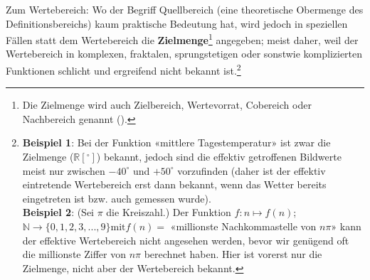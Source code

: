 
\begin{bemerkung}{}{}
  Zum Wertebereich: Wo der Begriff Quellbereich (eine theoretische Obermenge
  des Definitionsbereichs) kaum praktische Bedeutung hat,
  wird jedoch in speziellen Fällen statt dem Wertebereich die
  \textbf{Zielmenge}\footnote{Die Zielmenge
    wird auch Zielbereich, Wertevorrat,
    Cobereich oder Nachbereich
    genannt (\cite{FormelnUndTafeln19}).}
  angegeben; meist daher, weil der
  Wertebereich in komplexen, fraktalen, sprungstetigen oder sonstwie komplizierten Funktionen schlicht
  und ergreifend nicht bekannt ist.\footnote{\textbf{Beispiel 1}: Bei der Funktion
    «mittlere Tagestemperatur» ist zwar die Zielmenge ($\mathbb{R}[{}^\circ]$)
    bekannt, jedoch sind die effektiv getroffenen Bildwerte meist nur
    zwischen $-40^\circ$ und $+50^\circ$ vorzufinden (daher ist der
    effektiv eintretende Wertebereich erst dann bekannt, wenn das Wetter
    bereits eingetreten ist bzw. auch gemessen wurde). \\
    \textbf{Beispiel 2}: (Sei $\pi$ die Kreiszahl.) Der Funktion $f: n\mapsto f(n)$; $\mathbb{N} \rightarrow \{0, 1, 2, 3, ..., 9\} \text{mit} f(n) = $
    «millionste Nachkommastelle von $n\pi$»
    kann der effektive Wertebereich nicht
  angesehen werden, bevor wir genügend oft die millionste Ziffer von
  $n\pi$ berechnet haben. Hier ist vorerst nur die Zielmenge, nicht
  aber der Wertebereich bekannt.}
\end{bemerkung}



